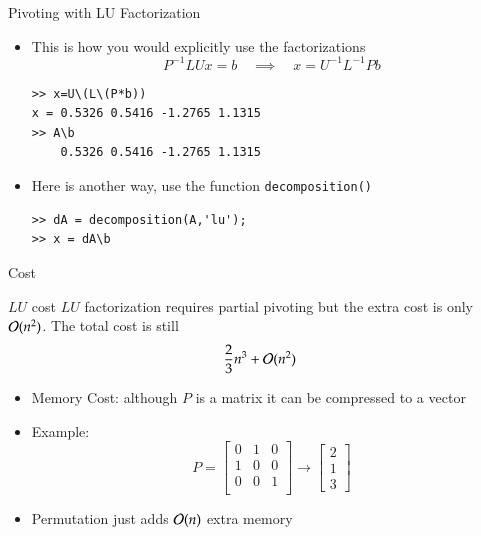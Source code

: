 \documentclass[10pt]{beamer}
\begin{document}
\begin{frame}{Pivoting with LU Factorization}
\begin{itemize}
    \item This is how you would explicitly use the factorizations 
    $$
    P^{-1}LUx=b \quad \implies \quad x = U^{-1}L^{-1}Pb
    $$
\begin{lstlisting}
>> x=U\(L\(P*b)) 
x = 0.5326 0.5416 -1.2765 1.1315
>> A\b
    0.5326 0.5416 -1.2765 1.1315
\end{lstlisting}

\vspace{1cm}

\item Here is another way, use the function \texttt{decomposition()}
\begin{lstlisting}
>> dA = decomposition(A,'lu');
>> x = dA\b
\end{lstlisting}

\end{itemize}

\end{frame}

\begin{frame}{Cost}

\begin{block}{$LU$ cost}
    $LU$ factorization requires partial pivoting but the extra cost is only ${\mathcal{O}}(n^2)$. The total cost is still 
    $$
    \frac23 n^3+{\mathcal{O}}(n^2)
    $$
\end{block}

\vfill 
\begin{itemize}
    \item Memory Cost: although $P$ is a matrix it can be compressed to a vector

    \vfill
    \item Example: 
    $$
      P=  \begin{bmatrix}
    0 & 1 & 0\\
    1 & 0 & 0\\
    0 & 0 & 1\\
    \end{bmatrix} \longrightarrow \begin{bmatrix}
        2\\1\\3
    \end{bmatrix}
    $$
    \vfill
    \item Permutation just adds ${\mathcal{O}}(n)$ extra memory
\end{itemize}

\end{frame}
\end{document}
